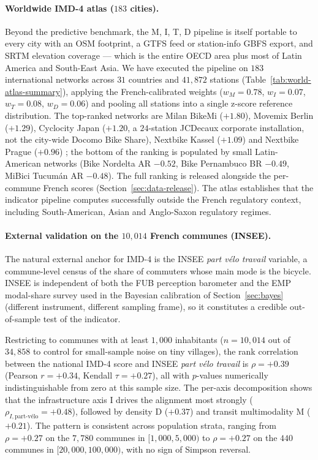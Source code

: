 \documentclass[11pt,a4paper]{article}
\begin{document}
\paragraph{Worldwide IMD-4 atlas ($183$ cities).}
\label{sec:world-atlas}
Beyond the predictive benchmark, the M, I, T, D pipeline is
itself portable to every city with an OSM footprint, a GTFS feed
or station-info GBFS export, and SRTM elevation coverage --- which
is the entire OECD area plus most of Latin America and
South-East Asia.  We have executed the pipeline on $183$
international networks across $31$ countries and $41{,}872$
stations (Table~\ref{tab:world-atlas-summary}), applying the
French-calibrated weights ($w_M = 0.78$, $w_I = 0.07$,
$w_T = 0.08$, $w_D = 0.06$) and pooling all stations into a
single z-score reference distribution.  The top-ranked networks
are Milan BikeMi ($+1.80$), Movemix Berlin ($+1.29$),
Cyclocity Japan ($+1.20$, a $24$-station JCDecaux corporate
installation, not the city-wide Docomo Bike Share),
Nextbike Kassel ($+1.09$) and Nextbike Prague ($+0.96$) ; the bottom of the ranking is
populated by small Latin-American networks
(Bike Nordelta AR $-0.52$, Bike Pernambuco BR $-0.49$,
MiBici Tucum\'an AR $-0.48$).  The full ranking is released alongside the per-commune French
scores (Section~\ref{sec:data-release}).  The atlas establishes
that the indicator pipeline computes successfully outside the
French regulatory context, including South-American, Asian and
Anglo-Saxon regulatory regimes.

\paragraph{External validation on the $10{,}014$ French
communes (INSEE).}
The natural external anchor for IMD-4 is the INSEE
\emph{part v\'elo travail} variable, a commune-level census of
the share of commuters whose main mode is the bicycle.  INSEE
is independent of both the FUB perception barometer and the EMP
modal-share survey used in the Bayesian calibration of
Section~\ref{sec:bayes} (different instrument, different
sampling frame), so it constitutes a credible out-of-sample
test of the indicator.

Restricting to communes with at least $1{,}000$ inhabitants
($n = 10{,}014$ out of $34{,}858$ to control for small-sample
noise on tiny villages), the rank correlation between the
national IMD-4 score and INSEE \emph{part v\'elo travail} is
$\rho = +0.39$ (Pearson $r = +0.34$, Kendall $\tau = +0.27$),
all with $p$-values numerically indistinguishable from zero at
this sample size.  The per-axis decomposition shows that the
infrastructure axis I drives the alignment most strongly
($\rho_{I, \text{part-v\'elo}} = +0.48$), followed by density D
($+0.37$) and transit multimodality M ($+0.21$).  The pattern
is consistent across population strata, ranging from
$\rho = +0.27$ on the $7{,}780$ communes in $[1{,}000, 5{,}000)$
to $\rho = +0.27$ on the $440$ communes in
$[20{,}000, 100{,}000)$, with no sign of Simpson reversal.
\end{document}
